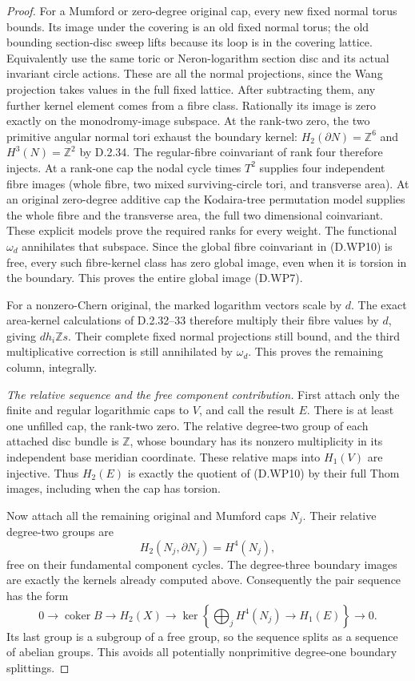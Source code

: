 \begin{proof}
For a Mumford or zero-degree original cap, every
new fixed normal torus bounds. Its image under
the covering is an old fixed normal torus; the
old bounding section-disc sweep lifts because
its loop is in the covering lattice. Equivalently
use the same toric or Neron-logarithm section
disc and its actual invariant circle actions.
These are all the normal projections, since
the Wang projection takes values in the full
fixed lattice.
After subtracting them, any further kernel
element comes from a fibre class. Rationally
its image is zero exactly on the monodromy-image
subspace. At the rank-two zero, the two primitive
angular normal tori exhaust the boundary kernel:
$H_2(\partial N)=\mathbb Z^6$ and
$H^3(N)=\mathbb Z^2$ by D.2.34. The regular-fibre
coinvariant of rank four therefore injects. At a
rank-one cap the nodal cycle times $T^2$ supplies
four independent fibre images (whole fibre, two
mixed surviving-circle tori, and transverse area).
At an original zero-degree additive cap the
Kodaira-tree permutation model supplies the whole
fibre and the transverse area, the full two
dimensional coinvariant. These explicit models
prove the required ranks for every weight.
The functional $\omega_d$ annihilates that
subspace. Since the global fibre coinvariant
in (D.WP10) is free, every such fibre-kernel
class has zero global image, even when it is
torsion in the boundary. This proves the entire
global image (D.WP7).

For a nonzero-Chern original, the marked logarithm
vectors scale by $d$. The exact area-kernel
calculations of D.2.32--33 therefore multiply
their fibre values by $d$, giving $dh_i\mathbb Zs$.
Their complete fixed normal projections still
bound, and the third multiplicative correction
is still annihilated by $\omega_d$.
This proves the remaining column, integrally.

\emph{The relative sequence and the free component contribution.}
First attach only the finite and regular logarithmic
caps to $V$, and call the result $E$. There is at
least one unfilled cap, the rank-two zero.
The relative degree-two group of each attached
disc bundle is $\mathbb Z$, whose boundary has
its nonzero multiplicity in its independent base
meridian coordinate. These relative maps into
$H_1(V)$ are injective. Thus $H_2(E)$ is exactly
the quotient of (D.WP10) by their full Thom
images, including when the cap has torsion.

Now attach all the remaining original and Mumford
caps $N_j$. Their relative degree-two groups are
\[
 H_2(N_j,\partial N_j)=H^4(N_j),
\]
free on their fundamental component cycles.
The degree-three boundary images are exactly
the kernels already computed above. Consequently
the pair sequence has the form
\[
 0\longrightarrow\operatorname{coker}B
 \longrightarrow H_2(X)
 \longrightarrow
 \ker\!\left\{\bigoplus_j H^4(N_j)\to H_1(E)\right\}
 \longrightarrow0.                                      \tag{D.WP11}
\]
Its last group is a subgroup of a free group,
so the sequence splits as a sequence of abelian
groups. This avoids all potentially nonprimitive
degree-one boundary splittings.


\end{proof}
